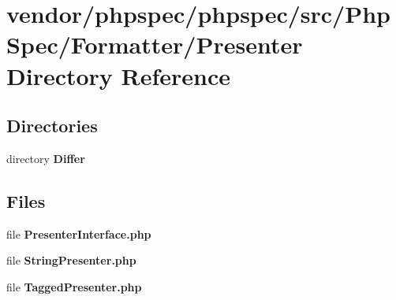\section{vendor/phpspec/phpspec/src/\+Php\+Spec/\+Formatter/\+Presenter Directory Reference}
\label{dir_84dd268df87da9495289e11057bb100e}
\subsection*{Directories}
\begin{DoxyCompactItemize}
\item 
directory {\bf Differ}
\end{DoxyCompactItemize}
\subsection*{Files}
\begin{DoxyCompactItemize}
\item 
file {\bf Presenter\+Interface.\+php}
\item 
file {\bf String\+Presenter.\+php}
\item 
file {\bf Tagged\+Presenter.\+php}
\end{DoxyCompactItemize}
